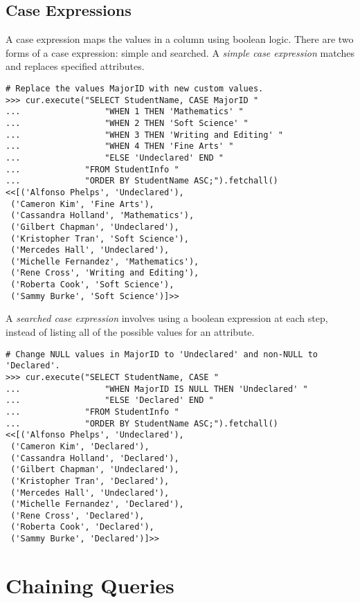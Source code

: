\subsection*{Case Expressions} %

A case expression maps the values in a column using boolean logic.
There are two forms of a case expression: simple and searched.
A \emph{simple case expression} matches and replaces specified attributes.

\begin{lstlisting}
# Replace the values MajorID with new custom values.
>>> cur.execute("SELECT StudentName, CASE MajorID "
...                 "WHEN 1 THEN 'Mathematics' "
...                 "WHEN 2 THEN 'Soft Science' "
...                 "WHEN 3 THEN 'Writing and Editing' "
...                 "WHEN 4 THEN 'Fine Arts' "
...                 "ELSE 'Undeclared' END "
...             "FROM StudentInfo "
...             "ORDER BY StudentName ASC;").fetchall()
<<[('Alfonso Phelps', 'Undeclared'),
 ('Cameron Kim', 'Fine Arts'),
 ('Cassandra Holland', 'Mathematics'),
 ('Gilbert Chapman', 'Undeclared'),
 ('Kristopher Tran', 'Soft Science'),
 ('Mercedes Hall', 'Undeclared'),
 ('Michelle Fernandez', 'Mathematics'),
 ('Rene Cross', 'Writing and Editing'),
 ('Roberta Cook', 'Soft Science'),
 ('Sammy Burke', 'Soft Science')]>>
\end{lstlisting}

A \emph{searched case expression} involves using a boolean expression at each step, instead of listing all of the possible values for an attribute.

\begin{lstlisting}
# Change NULL values in MajorID to 'Undeclared' and non-NULL to 'Declared'.
>>> cur.execute("SELECT StudentName, CASE "
...                 "WHEN MajorID IS NULL THEN 'Undeclared' "
...                 "ELSE 'Declared' END "
...             "FROM StudentInfo "
...             "ORDER BY StudentName ASC;").fetchall()
<<[('Alfonso Phelps', 'Undeclared'),
 ('Cameron Kim', 'Declared'),
 ('Cassandra Holland', 'Declared'),
 ('Gilbert Chapman', 'Undeclared'),
 ('Kristopher Tran', 'Declared'),
 ('Mercedes Hall', 'Undeclared'),
 ('Michelle Fernandez', 'Declared'),
 ('Rene Cross', 'Declared'),
 ('Roberta Cook', 'Declared'),
 ('Sammy Burke', 'Declared')]>>
\end{lstlisting}

\section*{Chaining Queries} %

